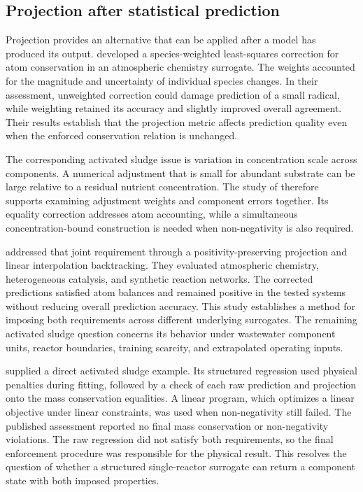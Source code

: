 \subsection{Projection after statistical prediction}

Projection provides an alternative that can be applied after a model has produced its output. \citet{SturmSilva2024} developed a species-weighted least-squares correction for atom conservation in an atmospheric chemistry surrogate. The weights accounted for the magnitude and uncertainty of individual species changes. In their assessment, unweighted correction could damage prediction of a small radical, while weighting retained its accuracy and slightly improved overall agreement. Their results establish that the projection metric affects prediction quality even when the enforced conservation relation is unchanged.

The corresponding activated sludge issue is variation in concentration scale across components. A numerical adjustment that is small for abundant substrate can be large relative to a residual nutrient concentration. The study of \citet{SturmSilva2024} therefore supports examining adjustment weights and component errors together. Its equality correction addresses atom accounting, while a simultaneous concentration-bound construction is needed when non-negativity is also required.

\citet{KircherVotsmeier2025} addressed that joint requirement through a positivity-preserving projection and linear interpolation backtracking. They evaluated atmospheric chemistry, heterogeneous catalysis, and synthetic reaction networks. The corrected predictions satisfied atom balances and remained positive in the tested systems without reducing overall prediction accuracy. This study establishes a method for imposing both requirements across different underlying surrogates. The remaining activated sludge question concerns its behavior under wastewater component units, reactor boundaries, training scarcity, and extrapolated operating inputs.

\citet{Selerio2026} supplied a direct activated sludge example. Its structured regression used physical penalties during fitting, followed by a check of each raw prediction and projection onto the mass conservation equalities. A linear program, which optimizes a linear objective under linear constraints, was used when non-negativity still failed. The published assessment reported no final mass conservation or non-negativity violations. The raw regression did not satisfy both requirements, so the final enforcement procedure was responsible for the physical result. This resolves the question of whether a structured single-reactor surrogate can return a component state with both imposed properties.

